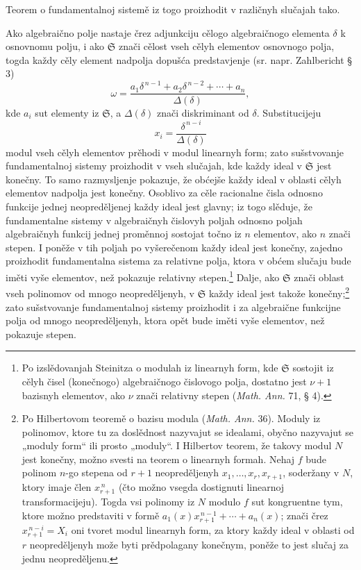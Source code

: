 \documentclass[11pt]{article}
\providecommand{\frS}{\mathfrak S}
\begin{document}
Teorem o fundamentalnoj sistemě iz togo proizhodit v različnyh slučajah tako.

Ako algebraično polje nastaje črez adjunkciju cělogo algebraičnogo elementa \(\delta\) k osnovnomu polju, i ako \(\frS\) znači cělost vseh cělyh elementov osnovnogo polja, togda každy cěly element nadpolja dopušća predstavjenje (sr. napr. Zahlbericht § 3)
\[
\omega=\frac{a_1\delta^{\,n-1}+a_2\delta^{\,n-2}+\cdots+a_n}{\Delta(\delta)},
\]
kde \(a_i\) sut elementy iz \(\frS\), a \(\Delta(\delta)\) znači diskriminant od \(\delta\). Substitucijeju
\[
x_i=\frac{\delta^{\,n-i}}{\Delta(\delta)}
\]
modul vseh cělyh elementov prěhodi v modul linearnyh form; zato sušstvovanje fundamentalnoj sistemy proizhodit v vseh slučajah, kde každy ideal v \(\frS\) jest konečny. To samo razmysljenje pokazuje, že obćejše každy ideal v oblasti cělyh elementov nadpolja jest konečny. Osoblivo za cěle racionalne čisla odnosno funkcije jednej neopreděljenej každy ideal jest glavny; iz togo slěduje, že fundamentalne sistemy v algebraičnyh čislovyh poljah odnosno poljah algebraičnyh funkcij jednej proměnnoj sostojat točno iz \(n\) elementov, ako \(n\) znači stepen. I poněže v tih poljah po vyšerečenom každy ideal jest konečny, zajedno proizhodit fundamentalna sistema za relativne polja, ktora v obćem slučaju bude iměti vyše elementov, než pokazuje relativny stepen.\footnote{Po izslědovanjah Steinitza o modulah iz linearnyh form, kde \(\frS\) sostojit iz cělyh čisel (konečnogo) algebraičnogo čislovogo polja, dostatno jest \(\nu+1\) bazisnyh elementov, ako \(\nu\) znači relativny stepen (\emph{Math. Ann.} 71, § 4).} Dalje, ako \(\frS\) znači oblast vseh polinomov od mnogo neopreděljenyh, v \(\frS\) každy ideal jest takože konečny;\footnote{Po Hilbertovom teoremě o bazisu modula (\emph{Math. Ann.} 36). Moduly iz polinomov, ktore tu za doslědnost nazyvajut se idealami, obyčno nazyvajut se „moduly form“ ili prosto „moduly“. I Hilbertov teorem, že takovy modul \(N\) jest konečny, možno svesti na teorem o linearnyh formah. Nehaj \(f\) bude polinom \(n\)-go stepena od \(r+1\) neopreděljenyh \(x_1,\ldots,x_r,x_{r+1}\), soderžany v \(N\), ktory imaje člen \(x_{r+1}^{\,n}\) (čto možno vsegda dostignuti linearnoj transformacijeju). Togda vsi polinomy iz \(N\) modulo \(f\) sut kongruentne tym, ktore možno predstaviti v formě \(a_1(x)x_{r+1}^{\,n-1}+\cdots+a_n(x)\); znači črez \(x_{r+1}^{\,n-i}=X_i\) oni tvoret modul linearnyh form, za ktory každy ideal v oblasti od \(r\) neopreděljenyh može byti prědpolagany konečnym, poněže to jest slučaj za jednu neopreděljenu.} zato sušstvovanje fundamentalnoj sistemy proizhodit i za algebraične funkcijne polja od mnogo neopreděljenyh, ktora opět bude iměti vyše elementov, než pokazuje stepen.
\end{document}
